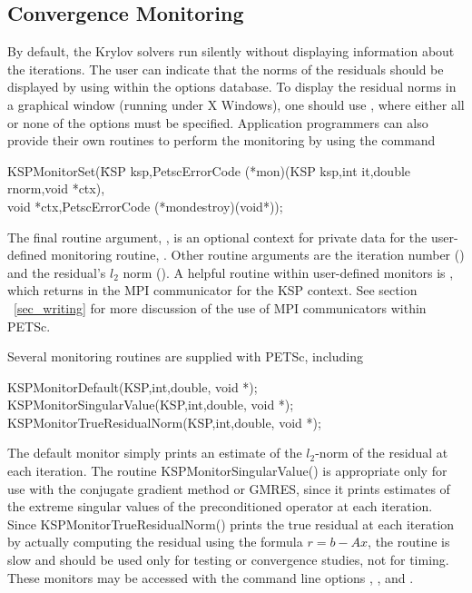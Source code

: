 \subsection{Convergence Monitoring}
\label{sec_kspmonitor}

By default, the Krylov solvers run silently without displaying information 
about the iterations. The user can indicate that the norms of the residuals 
should be displayed by using 
 within the options database.  
To display the residual norms in a graphical window (running under X Windows),
one should use  \trl{[x,y,w,h]}, where either all or none of 
the options must be specified. 
Application programmers can also provide their own routines to perform 
the monitoring by using the command 
\begin{tabbing}
  KSPMonitorSet(\=KSP ksp,PetscErrorCode (*mon)(KSP ksp,int it,double rnorm,void *ctx),\\
                \>        void *ctx,PetscErrorCode (*mondestroy)(void*));
\end{tabbing}
The final routine argument, , is an optional context for private
data for the user-defined monitoring routine, .  Other
 routine arguments are the iteration
number () and the residual's $ l_2 $ norm ().
A helpful routine within user-defined monitors is 
, which returns
in    the
MPI communicator for the KSP context.  See section ~\ref{sec_writing}
for more discussion of the use of MPI communicators within PETSc.

Several monitoring routines are supplied with PETSc, 
including  
\begin{tabbing}
  KSPMonitorDefault(KSP,int,double, void *);\\
  KSPMonitorSingularValue(KSP,int,double, void *);\\
  KSPMonitorTrueResidualNorm(KSP,int,double, void *);
\end{tabbing}
The default monitor simply prints an estimate of the $l_2$-norm of the 
residual at each iteration. The routine
KSPMonitorSingularValue() is appropriate only for use with the conjugate 
gradient method or GMRES, since it prints estimates of the extreme singular 
values of the preconditioned operator at each iteration. Since
KSPMonitorTrueResidualNorm() prints 
the true residual at each iteration by 
actually computing the residual using the formula $ r = b - Ax $, the routine
is slow and should be used only for testing or convergence studies,
not for timing. These monitors may be accessed with the command line options
, , and .
  

